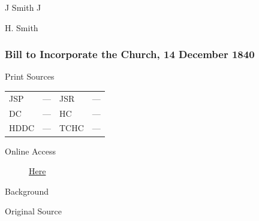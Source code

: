 				\begin{tightright}
					J Smith J

					H. Smith
				\end{tightright}
				
		\subsubsection{Bill to Incorporate the Church, 14 December 1840}
			\label{EMS-1840-JS-14-DEC-1840}
			
			\begin{description}
				\item[Print Sources]
			\end{description}

			\begin{tabular}{p{0.5in}p{1in}p{0.5in}p{1in}}
				JSP	 	& ---		& JSR 		& --- \\
				DC	 	& ---		& HC 		& --- \\
				HDDC 	& ---		& TCHC 		& --- \\
			\end{tabular}
			
			\begin{description}
				\item[Online Access] \href{https://www.josephsmithpapers.org/paper-summary/bill-to-incorporate-the-church-14-december-1840/1}{Here}
			\end{description}
			
			\begin{description}
				\item[Background]
			\end{description}
			
			
			\begin{description}
				\item[Original Source]
			\end{description}
			
			
